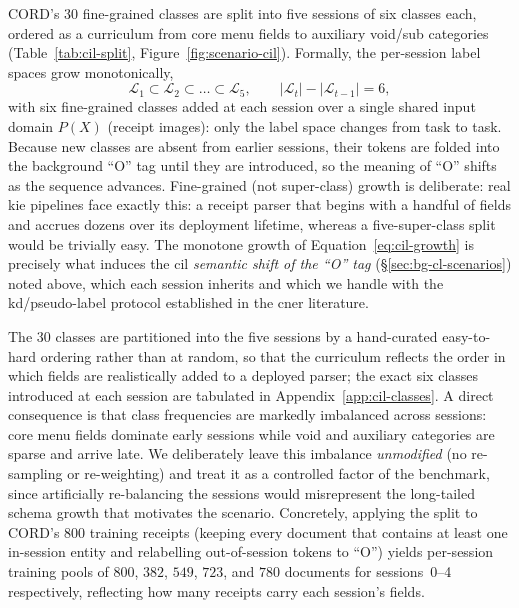 CORD's 30 fine-grained classes are split into five sessions of six classes each,
ordered as a curriculum from core menu fields to auxiliary void/sub categories
(Table~\ref{tab:cil-split}, Figure~\ref{fig:scenario-cil}). Formally, the per-session
label spaces grow monotonically,
\begin{equation}
  \mathcal{L}_1 \subset \mathcal{L}_2 \subset \dots \subset \mathcal{L}_5,
  \qquad |\mathcal{L}_{t}| - |\mathcal{L}_{t-1}| = 6,
  \label{eq:cil-growth}
\end{equation}
with six fine-grained classes added at each session over a single shared input
domain $P(X)$ (receipt images): only the label space changes from task to task.
Because new classes are absent from earlier sessions, their tokens are folded into
the background ``O'' tag until they are introduced, so the meaning of ``O'' shifts
as the sequence advances. Fine-grained (not super-class) growth is deliberate:
real \gls{kie} pipelines face exactly this: a receipt parser that begins with a
handful of fields and accrues dozens over its deployment lifetime, whereas a
five-super-class split would be trivially easy. The monotone growth of
Equation~\eqref{eq:cil-growth} is precisely what induces the \gls{cil}
\emph{semantic shift of the ``O'' tag} (\S\ref{sec:bg-cl-scenarios}) noted above,
which each session inherits and which we handle with the \gls{kd}/pseudo-label
protocol established in the \gls{cner} literature.

The 30 classes are partitioned into the five sessions by a hand-curated
easy-to-hard ordering rather than at random, so that the curriculum reflects the
order in which fields are realistically added to a deployed parser; the exact
six classes introduced at each session are tabulated in
Appendix~\ref{app:cil-classes}. A direct
consequence is that class frequencies are markedly imbalanced across sessions: core
menu fields dominate early sessions while void and auxiliary categories are sparse
and arrive late. We deliberately leave this imbalance \emph{unmodified} (no
re-sampling or re-weighting) and treat it as a controlled factor of the benchmark,
since artificially re-balancing the sessions would misrepresent the long-tailed
schema growth that motivates the scenario. Concretely, applying the split to
CORD's 800 training receipts (keeping every document that contains at least one
in-session entity and relabelling out-of-session tokens to ``O'') yields
per-session training pools of $800$, $382$, $549$, $723$, and $780$ documents for
sessions~0--4 respectively, reflecting how many receipts carry each session's fields.

